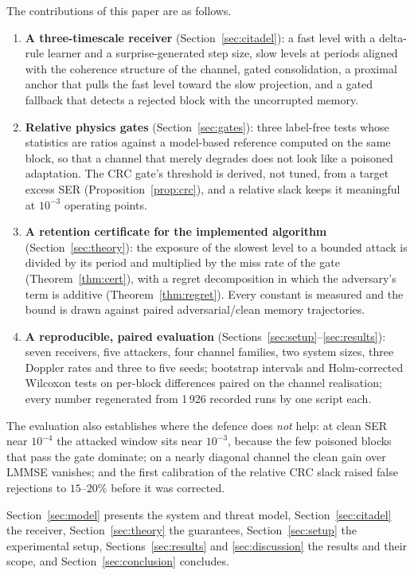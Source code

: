 \documentclass[journal]{IEEEtran}
\begin{document}
The contributions of this paper are as follows.
\begin{enumerate}
\item \textbf{A three-timescale receiver} (Section~\ref{sec:citadel}): a fast level with
a delta-rule learner and a surprise-generated step size, slow levels at periods aligned
with the coherence structure of the channel, gated consolidation, a proximal anchor that
pulls the fast level toward the slow projection, and a gated fallback that detects a
rejected block with the uncorrupted memory.
\item \textbf{Relative physics gates} (Section~\ref{sec:gates}): three label-free tests
whose statistics are ratios against a model-based reference computed on the same block,
so that a channel that merely degrades does not look like a poisoned adaptation. The CRC
gate's threshold is derived, not tuned, from a target excess SER
(Proposition~\ref{prop:crc}), and a relative slack keeps it meaningful at $10^{-3}$
operating points.
\item \textbf{A retention certificate for the implemented algorithm}
(Section~\ref{sec:theory}): the exposure of the slowest level to a bounded attack is
divided by its period and multiplied by the miss rate of the gate
(Theorem~\ref{thm:cert}), with a regret decomposition in which the adversary's term is
additive (Theorem~\ref{thm:regret}). Every constant is measured and the bound is drawn
against paired adversarial/clean memory trajectories.
\item \textbf{A reproducible, paired evaluation} (Sections~\ref{sec:setup}--\ref{sec:results}):
seven receivers, five attackers, four channel families, two system sizes, three Doppler
rates and three to five seeds; bootstrap intervals and Holm-corrected Wilcoxon tests on
per-block differences paired on the channel realisation; every number regenerated from
1\,926 recorded runs by one script each.
\end{enumerate}
The evaluation also establishes where the defence does \emph{not} help: at clean SER near
$10^{-4}$ the attacked window sits near $10^{-3}$, because the few poisoned blocks that
pass the gate dominate; on a nearly diagonal channel the clean gain over LMMSE vanishes;
and the first calibration of the relative CRC slack raised false rejections to
$15$--$20\%$ before it was corrected.

Section~\ref{sec:model} presents the system and threat model, Section~\ref{sec:citadel}
the receiver, Section~\ref{sec:theory} the guarantees, Section~\ref{sec:setup} the
experimental setup, Sections~\ref{sec:results} and \ref{sec:discussion} the results and
their scope, and Section~\ref{sec:conclusion} concludes.
\end{document}
